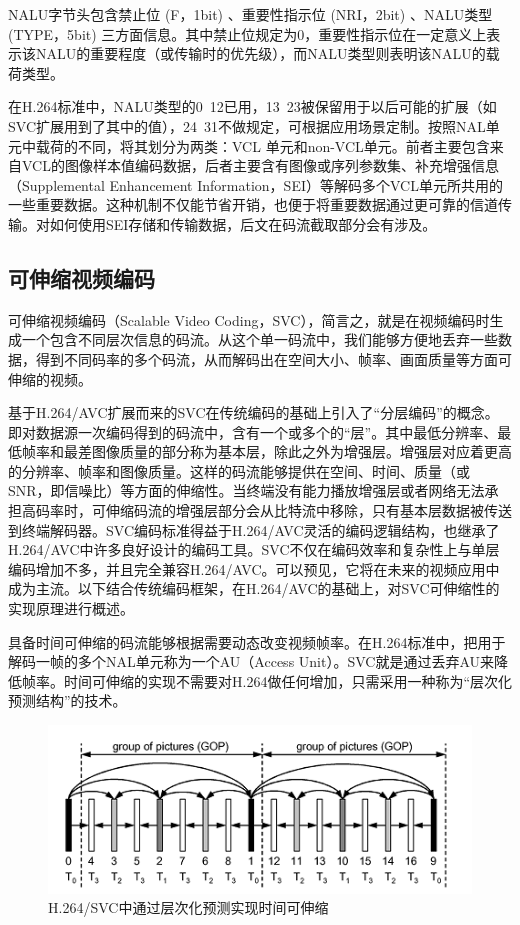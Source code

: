 NALU字节头包含禁止位 (F，1bit) 、重要性指示位 (NRI，2bit) 、NALU类型 (TYPE，5bit) 三方面信息。其中禁止位规定为0，重要性指示位在一定意义上表示该NALU的重要程度（或传输时的优先级），而NALU类型则表明该NALU的载荷类型。

在H.264标准中，NALU类型的0~12已用，13~23被保留用于以后可能的扩展（如SVC扩展用到了其中的值），24~31不做规定，可根据应用场景定制。按照NAL单元中载荷的不同，将其划分为两类：VCL 单元和non-VCL单元。前者主要包含来自VCL的图像样本值编码数据，后者主要含有图像或序列参数集、补充增强信息（Supplemental Enhancement Information，SEI）等解码多个VCL单元所共用的一些重要数据。这种机制不仅能节省开销，也便于将重要数据通过更可靠的信道传输。对如何使用SEI存储和传输数据，后文在码流截取部分会有涉及。

\subsection{可伸缩视频编码}

可伸缩视频编码（Scalable Video Coding，SVC），简言之，就是在视频编码时生成一个包含不同层次信息的码流。从这个单一码流中，我们能够方便地丢弃一些数据，得到不同码率的多个码流，从而解码出在空间大小、帧率、画面质量等方面可伸缩的视频。

基于H.264/AVC扩展而来的SVC在传统编码的基础上引入了“分层编码”的概念。即对数据源一次编码得到的码流中，含有一个或多个的“层”。其中最低分辨率、最低帧率和最差图像质量的部分称为基本层，除此之外为增强层。增强层对应着更高的分辨率、帧率和图像质量。这样的码流能够提供在空间、时间、质量（或SNR，即信噪比）等方面的伸缩性。当终端没有能力播放增强层或者网络无法承担高码率时，可伸缩码流的增强层部分会从比特流中移除，只有基本层数据被传送到终端解码器。SVC编码标准得益于H.264/AVC灵活的编码逻辑结构，也继承了H.264/AVC中许多良好设计的编码工具。SVC不仅在编码效率和复杂性上与单层编码增加不多\supercite{SVC-Performance}，并且完全兼容H.264/AVC。可以预见，它将在未来的视频应用中成为主流。以下结合传统编码框架，在H.264/AVC的基础上，对SVC可伸缩性的实现原理进行概述。

具备时间可伸缩的码流能够根据需要动态改变视频帧率。在H.264标准中，把用于解码一帧的多个NAL单元称为一个AU（Access Unit）。SVC就是通过丢弃AU来降低帧率。时间可伸缩的实现不需要对H.264做任何增加，只需采用一种称为“层次化预测结构”的技术。

\begin{figure}[h]
	\centering
	\includegraphics[width = 1.0\linewidth]{clip/04.png}
	\caption{H.264/SVC中通过层次化预测实现时间可伸缩\label{fig:04}}
\end{figure}


